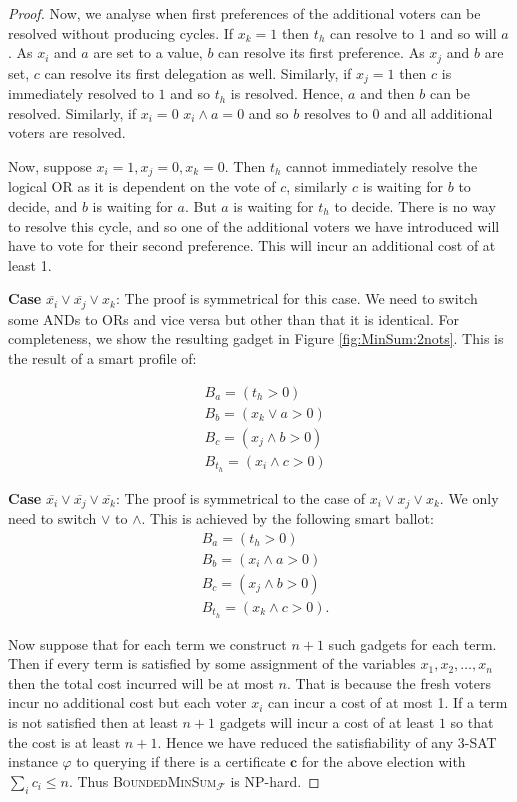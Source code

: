 \documentclass[11pt,a4paper, titlepage]{article}
\theoremstyle{definition}
\let\vec\mathbf
\begin{document}
\begin{proof}
    Now, we analyse when first preferences of the additional voters can be resolved without producing cycles. 
    If $x_k = 1$ then $t_h$ can resolve to $1$ and so will $a$. 
    As $x_i$ and $a$ are set to a value, $b$ can resolve its first preference. 
    As $x_j$ and $b$ are set, $c$ can resolve its first delegation as well. 
    Similarly, if $x_j = 1$ then $c$ is immediately resolved to $1$ and so $t_h$ is resolved. 
    Hence, $a$ and then $b$ can be resolved. 
    Similarly, if $x_i = 0$ $x_i \land a = 0$ and so $b$ resolves to $0$ and all additional voters are resolved.
    
    Now, suppose $x_i = 1, x_j = 0, x_k = 0$. Then $t_h$ cannot immediately resolve the logical OR as it is dependent on the vote of $c$, similarly $c$ is waiting for $b$ to decide, and $b$ is waiting for $a$. 
    But $a$ is waiting for $t_h$ to decide. 
    There is no way to resolve this cycle, and so one of the additional voters we have introduced will have to vote for their second preference. 
    This will incur an additional cost of at least 1.

    \textbf{Case} $\overline{x_i} \lor \overline{x_j} \lor x_k$: 
    The proof is symmetrical for this case. We need to switch some ANDs to ORs and vice versa but other than that it is identical. 
    For completeness, we show the resulting gadget in Figure \ref{fig:MinSum:2nots}. 
    This is the result of a smart profile of:

    \begin{align*}
        &B_a = (t_h > 0) \\
        &B_b = (x_k \lor a > 0) \\
        &B_c = (x_j \land b > 0) \\
        &B_{t_h} = (x_i \land c > 0)
    \end{align*}

    \textbf{Case} $\overline{x_i} \lor \overline{x_j} \lor \overline{x_k}$:
    The proof is symmetrical to the case of $x_i \lor x_j \lor x_k$. We only need to switch $\lor$ to $\land$. This is achieved by the following smart ballot:
    \begin{align*}
        &B_a = (t_h > 0) \\
        &B_b = (x_i \land a > 0) \\
        &B_c = (x_j \land b > 0) \\
        &B_{t_h} = (x_k \land c > 0).
    \end{align*}
    
    Now suppose that for each term we construct $n + 1$ such gadgets for each term. Then if every term is satisfied by some assignment of the variables $x_1, x_2, \ldots, x_n$ then the total cost incurred will be at most $n$. That is because the fresh voters incur no additional cost but each voter $x_i$ can incur a cost of at most 1.
    If a term is not satisfied then at least $n+1$ gadgets will incur a cost of at least $1$ so that the cost is at least $n+1$. 
    Hence we have reduced the satisfiability of any \textsc{3-SAT} instance $\varphi$ to querying if there is a certificate $\vec{c}$ for the above election with $\sum_{i} c_i \leq n$. Thus \textsc{BoundedMinSum}$_\mathcal{F}$ is NP-hard.
\end{proof}
\end{document}
